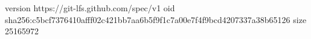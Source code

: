 version https://git-lfs.github.com/spec/v1
oid sha256:c5bcf7376410afff02c421bb7aa6b5f9f1c7a00e7f4f9bcd4207337a38b65126
size 25165972
